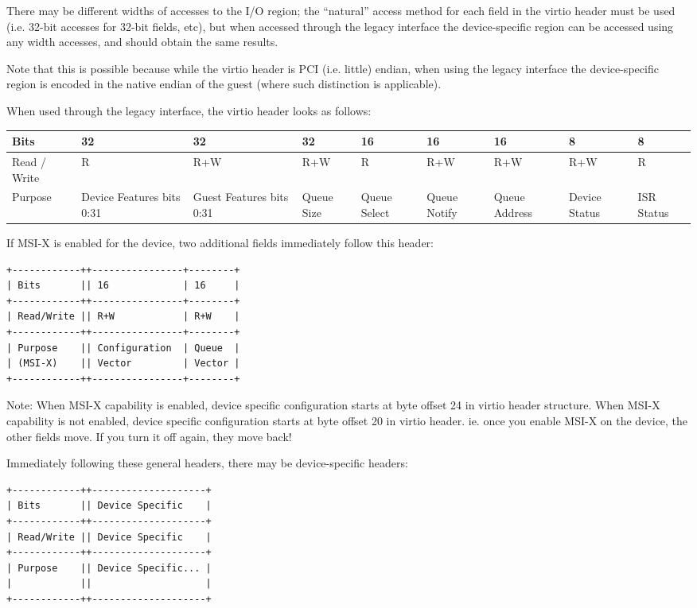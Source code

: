 There may be different widths of accesses to the I/O region; the
“natural” access method for each field in the virtio header must be
used (i.e. 32-bit accesses for 32-bit fields, etc), but 
when accessed through the legacy interface the
device-specific region can be accessed using any width accesses, and
should obtain the same results.

Note that this is possible because while the virtio header is PCI
(i.e. little) endian, when using the legacy interface the device-specific
region is encoded in the native endian of the guest (where such distinction is
applicable).

When used through the legacy interface, the virtio header looks as follows:

\begin{tabularx}{\textwidth}{ |X||X|X|X|X|X|X|X|X| }
\hline
 Bits & 32 & 32 & 32 & 16 & 16 & 16 & 8 & 8 \\
\hline
 Read / Write & R & R+W & R+W & R & R+W & R+W & R+W & R \\
\hline
 Purpose & Device Features bits 0:31 & Guest Features bits 0:31 &
  Queue Size & Queue Select & Queue Notify & Queue Address &
  Device Status & ISR \newline Status \\
\hline
\end{tabularx}

If MSI-X is enabled for the device, two additional fields
immediately follow this header:


\begin{verbatim}
+------------++----------------+--------+
| Bits       || 16             | 16     |
+------------++----------------+--------+
| Read/Write || R+W            | R+W    |
+------------++----------------+--------+
| Purpose    || Configuration  | Queue  |
| (MSI-X)    || Vector         | Vector |
+------------++----------------+--------+
\end{verbatim}

Note: When MSI-X capability is enabled, device specific configuration starts at
byte offset 24 in virtio header structure. When MSI-X capability is not
enabled, device specific configuration starts at byte offset 20 in virtio
header.  ie. once you enable MSI-X on the device, the other fields move.
If you turn it off again, they move back!

Immediately following these general headers, there may be
device-specific headers:

\begin{verbatim}
+------------++--------------------+
| Bits       || Device Specific    |
+------------++--------------------+
| Read/Write || Device Specific    |
+------------++--------------------+
| Purpose    || Device Specific... |
|            ||                    |
+------------++--------------------+
\end{verbatim}

